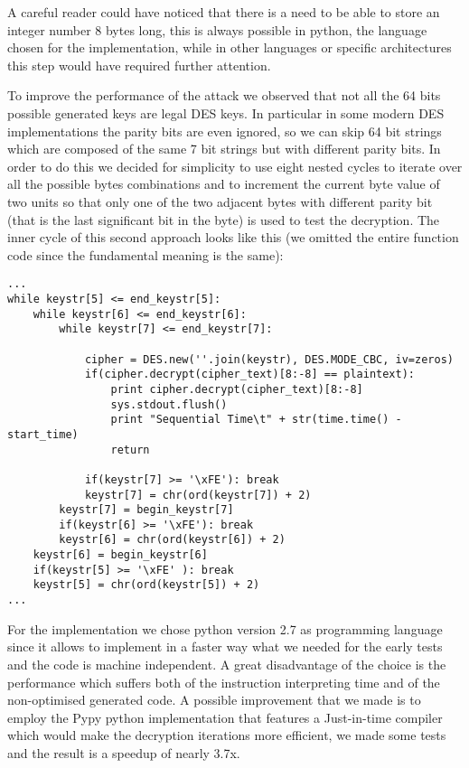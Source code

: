 \documentclass[11pt]{article}
\begin{document}
A careful reader could have noticed that there is a need to be able to store an integer number 8 bytes long, this is always possible in python, the language chosen for the implementation, while in other languages or specific architectures this step would have required further attention.

To improve the performance of the attack we observed that not all the 64 bits possible generated keys are legal DES keys. In particular in some modern DES implementations the parity bits are even ignored, so we can skip 64 bit strings which are composed of the same 7 bit strings but with different parity bits. In order to do this we decided for simplicity to use eight nested cycles to iterate over all the possible bytes combinations and to increment the current byte value of two units so that only one of the two adjacent bytes with different parity bit (that is the last significant bit in the byte) is used to test the decryption.
The inner cycle of this second approach looks like this (we omitted the entire function code since the fundamental meaning is the same):
\begin{verbatim}
...
while keystr[5] <= end_keystr[5]:
    while keystr[6] <= end_keystr[6]:
        while keystr[7] <= end_keystr[7]:
		
            cipher = DES.new(''.join(keystr), DES.MODE_CBC, iv=zeros)
            if(cipher.decrypt(cipher_text)[8:-8] == plaintext):
                print cipher.decrypt(cipher_text)[8:-8]
                sys.stdout.flush()
                print "Sequential Time\t" + str(time.time() - start_time)
                return
			
            if(keystr[7] >= '\xFE'): break
            keystr[7] = chr(ord(keystr[7]) + 2)
        keystr[7] = begin_keystr[7]
        if(keystr[6] >= '\xFE'): break
        keystr[6] = chr(ord(keystr[6]) + 2)
    keystr[6] = begin_keystr[6]
    if(keystr[5] >= '\xFE' ): break
    keystr[5] = chr(ord(keystr[5]) + 2)
...
\end{verbatim}

For the implementation we chose python version 2.7 as programming language since it allows to implement in a faster way what we needed for the early tests and the code is machine independent. A great disadvantage of the choice is the performance which suffers both of the instruction interpreting time and of the non-optimised generated code. A possible improvement that we made is to employ the Pypy python implementation that features a Just-in-time compiler which would make the decryption iterations more efficient, we made some tests and the result is a speedup of nearly 3.7x.
\end{document}
